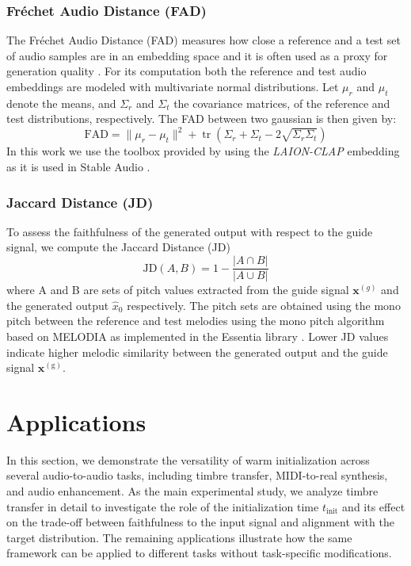\subsubsection{Fréchet Audio Distance (FAD)}
 The Fréchet Audio Distance (FAD) measures how close a reference and a test set of audio samples are  in an embedding space and it is often used as a proxy for generation quality \cite{kilgour2019frechetaudiodistancemetric}.
For its computation both the reference and test audio embeddings are modeled with multivariate normal distributions. Let $\mu_r$ and $\mu_t$ denote the means, and $\Sigma_r$ and $\Sigma_t$ the covariance matrices, of the reference and test distributions, respectively. The FAD between two gaussian is then given by:    \begin{equation}
        \mathrm{FAD} = \lVert \mu_r - \mu_t \rVert^2 
        + \operatorname{tr}\left( 
        \Sigma_r + \Sigma_t - 2\sqrt{\Sigma_r \Sigma_t} 
        \right)
    \end{equation}
In this work we use the toolbox provided by \cite{guiAdaptingFrechetAudio2024} using the \textit{LAION-CLAP} embedding as it is used in Stable Audio \cite{evans2024stableaudioopen}.

\subsubsection{Jaccard Distance (JD)}

To assess the faithfulness of the generated output with respect to the guide signal, we compute the Jaccard Distance (JD)
    \begin{equation}
        \mathrm{JD}(A, B) = 1 - \frac{|A \cap B|}{|A \cup B|}
    \end{equation}
where A and B are sets of pitch values extracted from the guide signal $\mathbf{x}^{(g)}$
and the generated output $\hat{x}_0$
respectively. The pitch sets are obtained using the mono pitch
between the reference and test melodies using the mono pitch algorithm based on MELODIA \cite{6155601} as implemented in the Essentia library \cite{10.1145/2502081.2502229}. Lower JD values indicate higher melodic similarity between the generated output and the guide signal $\mathbf{x}^{(\mathrm g)}$.

\section{Applications}
\label{Experiments}
In this section, we demonstrate the versatility of warm initialization across several audio-to-audio tasks, including timbre transfer, MIDI-to-real synthesis, and audio enhancement. As the main experimental study, we analyze timbre transfer in detail to investigate the role of the initialization time $t_\text{init}$ and its effect on the trade-off between faithfulness to the input signal and alignment with the target distribution. The remaining applications illustrate how the same framework can be applied to different tasks without task-specific modifications.

